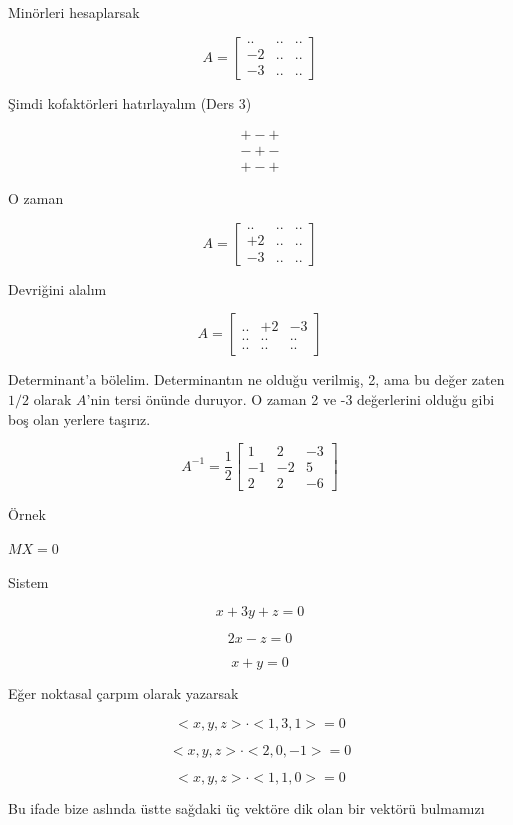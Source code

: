 \documentclass[12pt,fleqn]{article}\usepackage{../../common}
\begin{document}
Minörleri hesaplarsak

$$ A = 
\left[\begin{array}{rrr}
.. & .. & ..\\
-2 & .. & ..\\
-3 & .. & ..
\end{array}\right]
 $$

Şimdi kofaktörleri hatırlayalım (Ders 3)

$$ 
\begin{array}{rr}
+ - + \\
- + - \\
+ - + 
\end{array}
 $$

O zaman

$$ A = 
\left[\begin{array}{rrr}
.. & .. & ..\\
+2 & .. & ..\\
-3 & .. & ..
\end{array}\right]
 $$

Devriğini alalım

$$ A = 
\left[\begin{array}{rrr}
.. & +2 & -3\\
.. & .. & ..\\
.. & .. & ..
\end{array}\right]
 $$

Determinant'a bölelim. Determinantın ne olduğu verilmiş, 2, ama bu değer
zaten $1/2$ olarak $A$'nin tersi önünde duruyor. O zaman 2 ve -3
değerlerini olduğu gibi boş olan yerlere taşırız.

$$ A^{-1} = \frac{1}{2}
\left[\begin{array}{rrr}
1 & 2 & -3 \\
-1 & -2 & 5 \\
2 & 2 & -6
\end{array}\right]
 $$

Örnek

$MX = 0$

Sistem

$$ x + 3y + z = 0 $$

$$ 2x - z  = 0$$

$$ x + y = 0 $$

Eğer noktasal çarpım olarak yazarsak 

$$ < x,y,z > \cdot < 1,3,1 > = 0 $$

$$ < x,y,z > \cdot < 2,0,-1 > = 0 $$

$$ < x,y,z > \cdot < 1,1,0 > = 0 $$

Bu ifade bize aslında üstte sağdaki üç vektöre dik olan bir vektörü bulmamızı
\end{document}
